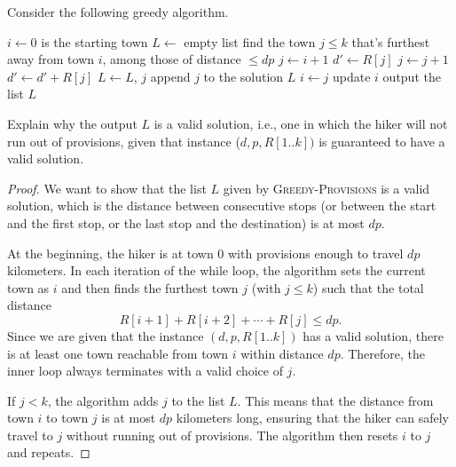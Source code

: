 \documentclass[11pt,fleqn]{exam}
\newenvironment{soln}{\color{solnblue}}{}
\newif\ifsolutions\solutionsfalse
\begin{document}
\begin{questions}
\ifsolutions

\fi

\clearpage
\question[2]
Consider the following greedy algorithm.

\vspace{.1in}

\begin{algorithmic}[1]
\State $i \leftarrow 0$  is the starting town
\State $L \leftarrow$ empty list
\State
   \Comment find the town $j \le k$ that's furthest away from town $i$, among those of distance $\le dp$
   \State   $j \leftarrow i+1$
   \State   $d' \leftarrow R[j]$
         \State      $j \leftarrow j+1$
         \State      $d' \leftarrow d' + R[j]$
         \EndWhile
      \State $L \leftarrow L$, $j$ \Comment append $j$ to the solution $L$
      \EndIf
   \State $i \leftarrow j$ \Comment update $i$
\EndWhile
\State output the list $L$
\EndProcedure
\end{algorithmic}
Explain why the output $L$ is a valid solution, i.e., one in which the hiker will
not run out of provisions, given that instance ($d,p,R[1..k])$ is 
guaranteed to have a valid solution.

\begin{soln}
   \begin{proof}
   We want to show that the list \( L \) given by \textsc{Greedy-Provisions} is a valid solution, which is 
   the distance between consecutive stops (or between the start and the first stop, or the last stop and the destination) 
   is at most \( dp \).
   
   At the beginning, the hiker is at town \( 0 \) with provisions 
   enough to travel \( dp \) kilometers. In each iteration of the while loop, 
   the algorithm sets the current town as \( i \) and then finds the furthest town \( j \) (with \( j\le k \)) 
   such that the total distance
   \[
   R[i+1] + R[i+2] + \cdots + R[j] \le dp.
   \]
   Since we are given that the instance \( (d,p,R[1..k]) \) has a valid solution, there is at least one 
   town reachable from town \( i \) within distance \( dp \). Therefore, the inner loop always terminates 
   with a valid choice of \( j \).
   
   If \( j < k \), the algorithm adds \( j \) to the list \( L \). This means that the distance from town \( i \) 
   to town \( j \) is at most \( dp \) kilometers long, ensuring that the hiker can safely travel to \( j \) 
   without running out of provisions. The algorithm then resets \( i \) to \( j \) and repeats.
   

\end{proof}
\end{soln}
\end{questions}
\end{document}
